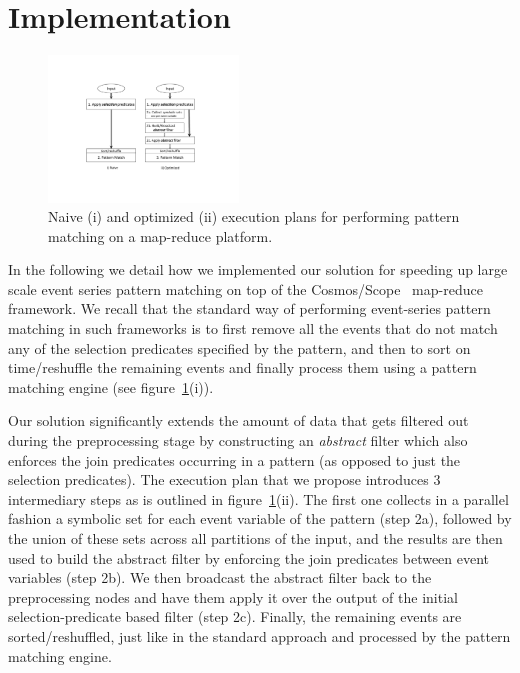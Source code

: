 \section{Implementation}
\label{sec:implementation}

\begin{figure}[tp]
\centering
\includegraphics[clip, trim=5.6cm 4.5cm 6.3cm 4.2cm, 
width=0.45\textwidth]{graphs/query_plan.pdf}
\caption{Naive (i) and optimized (ii) execution plans for performing pattern 
matching on a map-reduce platform.}
\label{fig:query_plan}
\end{figure}


In the following we detail how we implemented our solution for speeding up 
large scale event series pattern matching on top of the 
Cosmos/Scope~\cite{Chaiken:2008} map-reduce framework.
We recall that the standard way of performing event-series pattern matching in 
such frameworks is to first remove all the events that do not match any of the 
selection predicates specified by the pattern, and then to sort on 
time/reshuffle the remaining events and finally process them using a pattern 
matching engine (see figure~\ref{fig:query_plan}(i)).

Our solution significantly extends the amount of data that gets filtered out 
during the preprocessing stage by constructing an {\em abstract} filter which 
also enforces the join predicates occurring in a pattern (as opposed to just 
the selection predicates).
The execution plan that we propose introduces 3 intermediary steps as is 
outlined in figure~\ref{fig:query_plan}(ii).
The first one collects in a parallel fashion a symbolic set for each event 
variable of the pattern (step 2a), followed by the union of these sets across 
all partitions of the input, and the results are then used to build the 
abstract filter by enforcing the join predicates between event variables (step 
2b). 
We then broadcast the abstract filter back to the preprocessing nodes and have 
them apply it over the output of the initial selection-predicate based filter 
(step 2c). 
Finally, the remaining events are sorted/reshuffled, just like in the standard 
approach and processed by the pattern matching engine. 


